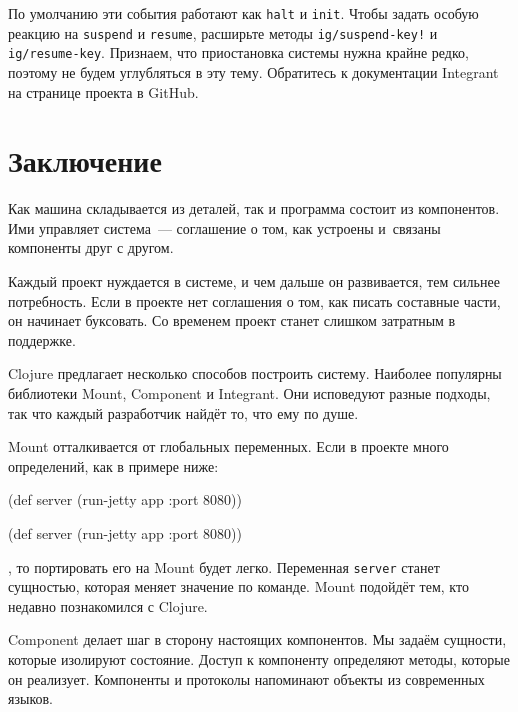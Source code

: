 \mnoindent
По умолчанию эти события работают как \verb|halt| и \verb|init|. Чтобы задать
особую реакцию на \verb|suspend| и \verb|resume|, расширьте методы
\texttt{ig/sus\-pend\--key!} и \verb|ig/resume-key|. Признаем, что приостановка
системы нужна крайне редко, поэтому не будем углубляться в эту тему. Обратитесь
к документации Integrant на странице проекта в GitHub.

\section{Заключение}

Как машина складывается из деталей, так и программа состоит из компонентов. Ими
управляет система~--- соглашение о том, как устроены и~связаны компоненты друг с
другом.

Каждый проект нуждается в системе, и чем дальше он развивается, тем сильнее
потребность. Если в проекте нет соглашения о том, как писать составные части, он
начинает буксовать. Со временем проект станет слишком затратным в поддержке.

Clojure предлагает несколько способов построить систему. Наиболее популярны
библиотеки Mount, Component и Integrant. Они исповедуют разные подходы, так что
каждый разработчик найдёт то, что ему по душе.

Mount отталкивается от глобальных переменных. Если в проекте много определений,
как в примере ниже:

\ifnarrow

\begin{english}
  \begin{clojure}
(def server
  (run-jetty app {:port 8080}))
  \end{clojure}
\end{english}

\else

\begin{english}
  \begin{clojure}
(def server (run-jetty app {:port 8080}))
  \end{clojure}
\end{english}

\fi

\noindent
, то портировать его на Mount будет легко. Переменная \verb|server| станет
сущностью, которая меняет значение по команде. Mount подойдёт тем, кто недавно
познакомился с Clojure.

Component делает шаг в сторону настоящих компонентов. Мы задаём сущности,
которые изолируют состояние. Доступ к компоненту определяют методы, которые он
реализует. Компоненты и протоколы напоминают объекты из современных языков.

